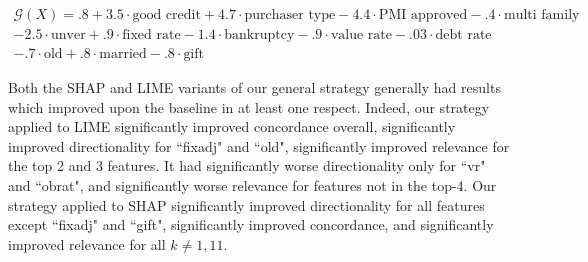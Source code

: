 \documentclass[mnsc,blindrev]{informs3}
\begin{document}
    \begin{tcolorbox}[title = Econometric Ground Truth Model $\mathcal{G}$]
    \begin{equation}
    \label{eqn:econ_gt}
    \begin{split}
        \mathcal{G}(X) =.8 + 3.5\cdot \text{good credit} + 4.7\cdot \text{purchaser type} -4.4 \cdot \text{PMI approved} - .4 \cdot \text{multi family} \\ -2.5 \cdot \text{unver} + .9 \cdot \text{fixed rate} - 1.4 \cdot \text{bankruptcy} - .9 \cdot \text{value rate} - .03 \cdot \text{debt rate} \\- .7 \cdot \text{old} + .8 \cdot \text{married} - .8 \cdot \text{gift}
    \end{split}
    \end{equation}
    \end{tcolorbox}

    Both the SHAP and LIME variants of our general strategy generally had results which improved upon the baseline in at least one respect. Indeed, our strategy applied to LIME significantly improved concordance overall, significantly improved directionality for ``fixadj" and ``old", significantly improved relevance for the top 2 and 3 features. It had significantly worse directionality only for ``vr" and ``obrat", and significantly worse relevance for features not in the top-4. Our strategy applied to SHAP significantly improved directionality for all features except ``fixadj" and ``gift", significantly improved concordance, and significantly improved relevance for all $k\neq 1,11$. 
    
     
\end{document}
